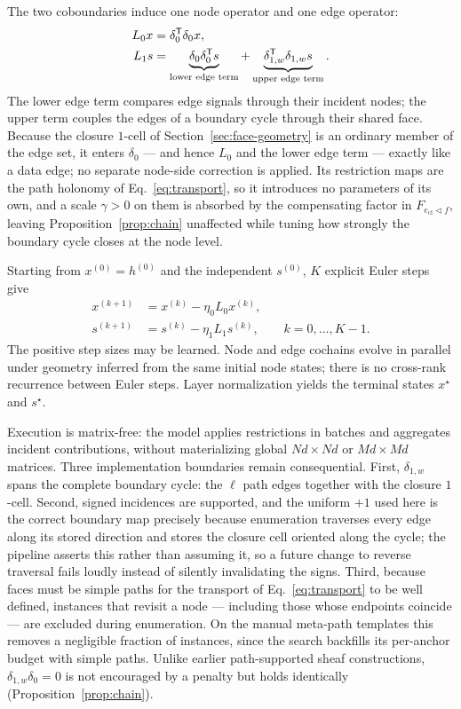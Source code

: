 The two coboundaries induce one node operator and one edge operator:
\begin{align}
  L_0x
  &=\delta_0^{\mathsf{T}}\delta_0x,
  \label{eq:l0}\\
  L_1s
  &=\underbrace{\delta_0\delta_0^{\mathsf{T}}s}_{\text{lower edge term}}
    +\underbrace{\delta_{1,w}^{\mathsf{T}}\delta_{1,w}s}_{\text{upper edge term}} .
  \label{eq:l1}
\end{align}
The lower edge term compares edge signals through their incident nodes; the upper term couples the
edges of a boundary cycle through their shared face.  Because the closure \(1\)-cell of
Section~\ref{sec:face-geometry} is an ordinary member of the edge set, it enters \(\delta_0\) — and hence
\(L_0\) and the lower edge term — exactly like a data edge; no separate node-side correction is
applied.  Its restriction maps are the path holonomy of Eq.~\eqref{eq:transport}, so it introduces
no parameters of its own, and a scale \(\gamma>0\) on them is absorbed by the compensating factor in
\(F_{e_{\mathrm{cl}}\lhd f}\), leaving Proposition~\ref{prop:chain} unaffected while tuning how
strongly the boundary cycle closes at the node level.

Starting from \(x^{(0)}=h^{(0)}\) and the independent \(s^{(0)}\), \(K\) explicit Euler steps give
\begin{equation}
  \begin{aligned}
  x^{(k+1)}&=x^{(k)}-\eta_0L_0x^{(k)},\\
  s^{(k+1)}&=s^{(k)}-\eta_1L_1s^{(k)},
  \qquad k=0,\ldots,K-1 .
  \end{aligned}
  \label{eq:diffusion}
\end{equation}
The positive step sizes may be learned.  Node and edge cochains evolve in parallel under geometry
inferred from the same initial node states; there is no cross-rank recurrence between Euler steps.
Layer normalization yields the terminal states \(x^\star\) and \(s^\star\).

Execution is matrix-free: the model applies restrictions in batches and aggregates incident
contributions, without materializing global \(Nd\times Nd\) or \(Md\times Md\) matrices.  Three
implementation boundaries remain consequential.  First, \(\delta_{1,w}\) spans the complete boundary
cycle: the \(\ell\) path edges together with the closure \(1\)-cell.  Second, signed incidences are
supported, and the uniform \(+1\) used here is the correct boundary map precisely because
enumeration traverses every edge along its stored direction and stores the closure cell oriented
along the cycle; the pipeline asserts this rather than assuming it, so a future change to reverse
traversal fails loudly instead of silently invalidating the signs.  Third, because faces must be
simple paths for the transport of Eq.~\eqref{eq:transport} to be well defined, instances that revisit
a node — including those whose endpoints coincide — are excluded during enumeration.  On the
manual meta-path templates this removes a negligible fraction of instances, since the search
backfills its per-anchor budget with simple paths.  Unlike earlier path-supported sheaf
constructions, \(\delta_{1,w}\delta_0=0\) is not encouraged by a penalty but holds identically
(Proposition~\ref{prop:chain}).

